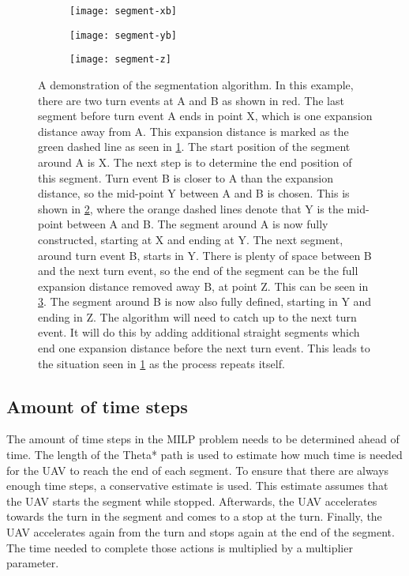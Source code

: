 \begin{figure}
	\centering
	\begin{subfigure}[t]{0.3\columnwidth}
        		\texttt{[image: segment-xb]}
        		\caption{}
        		 \label{fig:segment-demo-x}
	\end{subfigure}	
	\hfill
	\begin{subfigure}[t]{0.3\columnwidth}
        		\texttt{[image: segment-yb]}
        		\caption{}
        		 \label{fig:segment-demo-y}
	\end{subfigure}	
		\hfill
	\begin{subfigure}[t]{0.3\columnwidth}
        		\texttt{[image: segment-z]}
        		\caption{}
        		 \label{fig:segment-demo-z}
	\end{subfigure}	
	\caption[A demonstration of the segmentation algorithm]{A demonstration of the segmentation algorithm. In this example, there are two turn events at A and B as shown in red. The last segment before turn event A ends in point X, which is one expansion distance away from A. This expansion distance is marked as the green dashed line as seen in \ref{fig:segment-demo-x}. The start position of the segment around A is X. The next step is to determine the end position of this segment. Turn event B is closer to A than the expansion distance, so the mid-point Y between A and B is chosen. This is shown in \ref{fig:segment-demo-y}, where the orange dashed lines denote that Y is the mid-point between A and B. The segment around A is now fully constructed, starting at X and ending at Y. The next segment, around turn event B, starts in Y. There is plenty of space between B and the next turn event, so the end of the segment can be the full expansion distance removed away B, at point Z. This can be seen in \ref{fig:segment-demo-z}. The segment around B is now also fully defined, starting in Y and ending in Z. The algorithm will need to catch up to the next turn event. It will do this by adding additional straight segments which end one expansion distance before the next turn event. This leads to the situation seen in \ref{fig:segment-demo-x} as the process repeats itself.}
    \label{fig:segment-demo}     
\end{figure}

\subsection{Amount of time steps}
The amount of time steps in the MILP problem needs to be determined ahead of time. The length of the Theta* path is used to estimate how much time is needed for the UAV to reach the end of each segment. To ensure that there are always enough time steps, a conservative estimate is used. This estimate assumes that the UAV starts the segment while stopped. Afterwards, the UAV accelerates towards the turn in the segment and comes to a stop at the turn. Finally, the UAV accelerates again from the turn and stops again at the end of the segment. The time needed to complete those actions is multiplied by a multiplier parameter.



